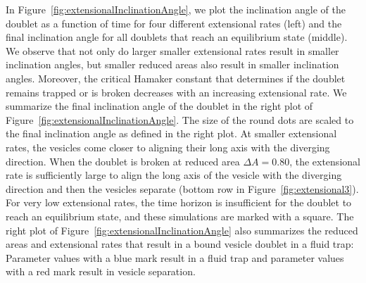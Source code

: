 \documentclass[prf,superscriptaddress,showpacs]{revtex4-1}
\begin{document}
In Figure~\ref{fig:extensionalInclinationAngle}, we plot the inclination
angle of the doublet as a function of time for four different
extensional rates (left) and the final inclination angle for all
doublets that reach an equilibrium state (middle).  We observe that not
only do larger smaller extensional rates result in smaller inclination
angles, but smaller reduced areas also result in smaller inclination
angles.  Moreover, the critical Hamaker constant that determines if the
doublet remains trapped or is broken decreases with an increasing
extensional rate.
We summarize the final inclination angle of the
doublet in the right plot of Figure~\ref{fig:extensionalInclinationAngle}.
The size of the round dots are scaled to the final inclination angle as
defined in the right plot.  At smaller extensional rates, the vesicles
come closer to aligning their long axis with the diverging direction.
When the doublet is broken at reduced area $\Delta A = 0.80$, the
extensional rate is sufficiently large to align the long axis of the
vesicle with the diverging direction and then the vesicles separate
(bottom row in Figure~\ref{fig:extensional3}).  For very low extensional rates, the
time horizon is insufficient for the doublet to reach an equilibrium
state, and these simulations are marked with a square.
%
The right plot of Figure~\ref{fig:extensionalInclinationAngle} 
also summarizes the  reduced areas and
extensional rates that result in a bound vesicle doublet in a fluid trap: Parameter values with a blue
mark result in a fluid trap and parameter values with a red mark result
in vesicle separation.
\end{document}
